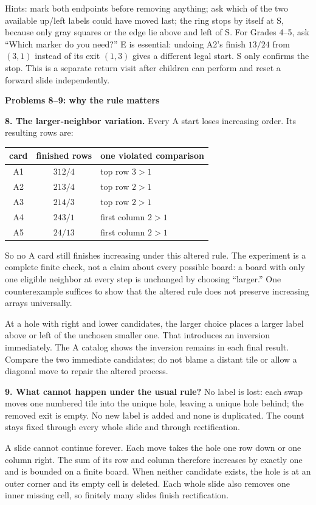 \documentclass[11pt]{article}
\newcommand{\heading}[1]{\par\textbf{#1}\par}
\begin{document}
Hints: mark both endpoints before removing anything; ask which of the two available up/left labels could have moved last; the ring stops by itself at S, because only gray squares or the edge lie above and left of S. For Grades 4--5, ask ``Which marker do you need?'' E is essential: undoing A2's finish $13/24$ from $(3,1)$ instead of its exit $(1,3)$ gives a different legal start. S only confirms the stop. This is a separate return visit after children can perform and reset a forward slide independently.
\newpage
\heading{Problems 8--9: why the rule matters}
\textbf{8. The larger-neighbor variation.} Every A start loses increasing order. Its resulting rows are:
\begin{center}\begin{tabular}{ccl}\toprule
card&finished rows&one violated comparison\\\midrule
A1&$312/4$&top row $3>1$\\
A2&$213/4$&top row $2>1$\\
A3&$214/3$&top row $2>1$\\
A4&$243/1$&first column $2>1$\\
A5&$24/13$&first column $2>1$\\\bottomrule
\end{tabular}\end{center}
So no A card still finishes increasing under this altered rule. The experiment is a complete finite check, not a claim about every possible board: a board with only one eligible neighbor at every step is unchanged by choosing ``larger.'' One counterexample suffices to show that the altered rule does not preserve increasing arrays universally.

At a hole with right and lower candidates, the larger choice places a larger label above or left of the unchosen smaller one. That introduces an inversion immediately. The A catalog shows the inversion remains in each final result. Compare the two immediate candidates; do not blame a distant tile or allow a diagonal move to repair the altered process.

\textbf{9. What cannot happen under the usual rule?} No label is lost: each swap moves one numbered tile into the unique hole, leaving a unique hole behind; the removed exit is empty. No new label is added and none is duplicated. The count stays fixed through every whole slide and through rectification.

A slide cannot continue forever. Each move takes the hole one row down or one column right. The sum of its row and column therefore increases by exactly one and is bounded on a finite board. When neither candidate exists, the hole is at an outer corner and its empty cell is deleted. Each whole slide also removes one inner missing cell, so finitely many slides finish rectification.
\end{document}
